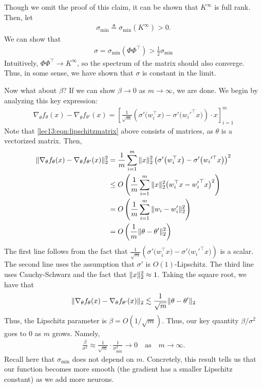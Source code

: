 \begin{enumerate}
    Though we omit the proof of this claim, it can be shown that $K^\infty$ is full rank. Then, let \begin{align}
        \sigma_{\min} \triangleq \sigma_{\min} (K^\infty) > 0.
    \end{align}
    We can show that 
    \begin{align}
        \sigma = \sigma_{\min} \left( \Phi \Phi^\top \right) > \frac{1}{2}\sigma_{\min} 
    \end{align} 
    Intuitively, $\Phi \Phi^\top \to K^\infty$, so the spectrum of the matrix should also converge. Thus, in some sense, we have shown that $\sigma$ is constant in the limit. 
    
    Now what about $\beta$? If we can show $\beta \to 0$ as $m \to \infty$, we are done. We begin by analyzing this key expression:  
    \begin{align}
        \nabla_\theta f_\theta(x) - \nabla_\theta f_{\theta'} (x) = \left[ \frac{1}{\sqrt{m}} \left( \sigma' \big( w_i^\top x \big) - \sigma' \big({w_i'}^\top x \big) \right) \cdot x \right]_{i=1}^m \label{lec13:eqn:lipschitzmatrix}
    \end{align}
    Note that \eqref{lec13:eqn:lipschitzmatrix} above consists of matrices, as $\theta$ is a vectorized matrix. Then,
    \begin{align}
        \|\nabla_\theta f_\theta(x) - \nabla_\theta f_{\theta'}(x)\|_2^2 & = \frac{1}{m}\sum_{i=1}^m \|x\|_2^2 \left( \sigma' \big(w_i^\top x \big) - \sigma' \big({w_i}'^\top x \big) \right)^2  \\ 
        & \leq O \left( \frac{1}{m}\sum_{i=1}^m \| x\|_2^2 \big( w_i^\top x - {w_i'}^\top x \big)^2 \right) \\ 
        & =  O \left( \frac{1}{m}\sum_{i=1}^m \| w_i - w_i'\|_2^2 \right) \\ 
        & = O \left(\frac{1}{m} \| \theta - \theta' \|_2^2 \right)
    \end{align} 
    The first line follows from the fact that $\frac{1}{\sqrt{m}} \left( \sigma' \big( w_i^\top x \big) - \sigma' \big({w_i'}^\top x \big) \right)$ is a scalar. The second line uses the assumption that $\sigma'$ is $O(1)$-Lipschitz. The third line uses Cauchy-Schwarz and the fact that $\|x\|_2^2 \approx 1$. Taking the square root, we have that
    \begin{align} 
        \|\nabla_\theta f_\theta(x) - \nabla_\theta f_{\theta'}(x)\|_2 \lesssim \frac{1}{\sqrt{m} } \| \theta -\theta' \|_2
    \end{align} 
    Thus, the Lipschitz parameter is $\beta = O(1/\sqrt{m})$. Thus, our key quantity $\beta/\sigma^2$ goes to $0$ as $m$ grows. Namely,
    \begin{align} 
        \frac{\beta}{\sigma^2} \approx \frac{1}{\sqrt{m} }\cdot \frac{1}{\sigma_{\min}^2} \to 0 \quad \text{as} \quad m\to\infty.
    \end{align} 
    Recall here that $\sigma_{\min}$ does not depend on $m$. Concretely, this result tells us that our function becomes more smooth (the gradient has a smaller Lipschitz constant) as we add more neurons. 
\end{enumerate}

